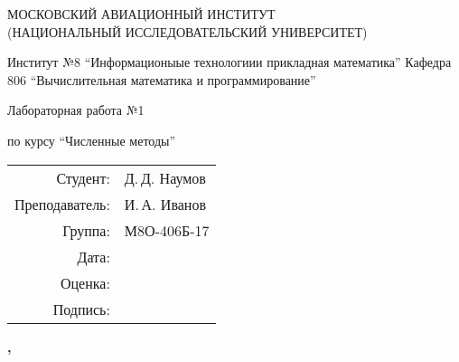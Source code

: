 \begin{titlepage}
\begin{spacing}{1.2}
\begin{center}
{\large 
МОСКОВСКИЙ АВИАЦИОННЫЙ ИНСТИТУТ\\ 
(НАЦИОНАЛЬНЫЙ ИССЛЕДОВАТЕЛЬСКИЙ УНИВЕРСИТЕТ)
}
\vspace{24pt}

{\large
Институт №8 \enquote{Информационыые технологиии прикладная математика}
}
{\large
Кафедра 806 \enquote{Вычислительная математика и программирование}
}
\vspace{96pt}

\bfseries
{\Large
Лабораторная работа №1

по курсу \enquote{Численные методы}
}

\end{center}

\vspace{72pt}

\begin{flushright}
\begin{tabular}{r l}
    \large Студент: & \large Д.\,Д. Наумов \\
    \large Преподаватель: & \large И.\,А. Иванов \\
    \large Группа: \large & М8О-406Б-17 \\
    \large Дата: & \\
    \large Оценка: & \\
    \large Подпись: & \\
\end{tabular}
\end{flushright}

\vfill

\begin{center}
\bfseries
{}, \the\year
\end{center}
\end{spacing}
\end{titlepage}

\pagebreak
